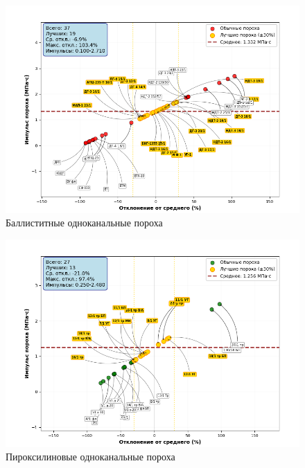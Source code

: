 \documentclass[14pt, a4paper]{extreport} %
\begin{document}
\begin{figure}[H]
\centering
\includegraphics[width=0.6\textheight]{imgs/kaif.png}
\caption{Баллиститные одноканальные пороха}
\end{figure}

\begin{figure}[H]
\centering
\includegraphics[width=0.6\textheight]{imgs/kaif2.png}
\caption{Пироксилиновые одноканальные пороха}
\end{figure}
\end{document}
